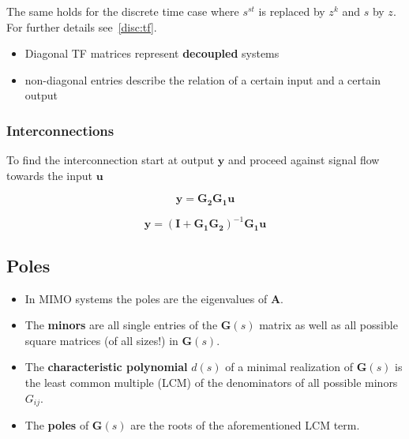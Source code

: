 
The same holds for the discrete time case where $s^{st}$ is replaced by $z^k$ and $s$ by $z$. For further details see~\ref{disc:tf}.

\newpar{}
\begin{itemize}
    \item Diagonal TF matrices represent \textbf{decoupled} systems
    \item non-diagonal entries describe the relation of a certain input and a certain output
\end{itemize}

\subsubsection{Interconnections}

To find the interconnection start at output $\mathbf{y}$ and proceed against signal flow towards the input $\mathbf{u}$

\newpar{}
\newpar{}
\begin{center}
    
\end{center}

\begin{equation*}
    \mathbf{y}=\mathbf{G_2G_1u}
\end{equation*}

\newpar{}
\newpar{}
\begin{center}
    
\end{center}

\begin{equation*}
    \mathbf{y}={(\mathbf{I}+\mathbf{G_1G_2})}^{-1}\mathbf{G_1u}
\end{equation*}


\subsection{Poles}

\begin{itemize}
    \item In MIMO systems the poles are the eigenvalues of $\mathbf{A}$.
    \item The \textbf{minors} are all single entries of the $\mathbf{G}(s)$ matrix as well as all possible square matrices (of all sizes!) in $\mathbf{G}(s)$. %
    \item The \textbf{characteristic polynomial} $d(s)$ of a minimal realization of $\mathbf{G}(s)$ is the least common multiple (LCM) of the denominators of all possible minors $G_{ij}$.
    \item The \textbf{poles} of $\mathbf{G}(s)$ are the roots of the aforementioned LCM term.
\end{itemize}

